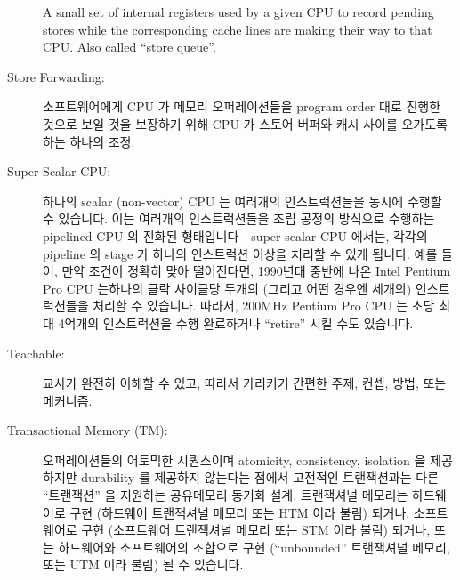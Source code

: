 \begin{description}
	A small set of internal registers used by a given CPU
	to record pending stores
	while the corresponding cache lines are making their
	way to that CPU.
	Also called ``store queue''.
	\fi
\item[Store Forwarding:]
	소프트웨어에게 CPU 가 메모리 오퍼레이션들을 program order 대로 진행한
	것으로 보일 것을 보장하기 위해 CPU 가 스토어 버퍼와 캐시 사이를
	오가도록 하는 하나의 조정.
	\iffalse

	An arrangement where a given CPU refers to its store buffer
	as well as its cache so as to ensure that the software sees
	the memory operations performed by this CPU as if they
	were carried out in program order.
	\fi
\item[Super-Scalar CPU:]
	하나의 scalar (non-vector) CPU 는 여러개의 인스트럭션들을 동시에 수행할
	수 있습니다.
	이는 여러개의 인스트럭션들을 조립 공정의 방식으로 수행하는 pipelined
	CPU 의 진화된 형태입니다---super-scalar CPU 에서는, 각각의 pipeline 의
	stage 가 하나의 인스트럭션 이상을 처리할 수 있게 됩니다.
	예를 들어, 만약 조건이 정확히 맞아 떨어진다면, 1990년대 중반에 나온
	Intel Pentium Pro CPU 는하나의 클락 사이클당 두개의 (그리고 어떤 경우엔
	세개의) 인스트럭션들을 처리할 수 있습니다.
	따라서, 200MHz Pentium Pro CPU 는 초당 최대 4억개의 인스트럭션을 수행
	완료하거나 ``retire'' 시킬 수도 있습니다.
	\iffalse

	A scalar (non-vector) CPU capable of executing multiple instructions
	concurrently.
	This is a step up from a pipelined CPU that executes multiple
	instructions in an assembly-line fashion---in a super-scalar
	CPU, each stage of the pipeline would be capable of handling
	more than one instruction.
	For example, if the conditions were exactly right,
	the Intel Pentium Pro CPU from the mid-1990s could
	execute two (and sometimes three) instructions per clock cycle.
	Thus, a 200\,MHz Pentium Pro CPU could ``retire'', or complete the
	execution of, up to 400 million instructions per second.
	\fi
\item[Teachable:]
	교사가 완전히 이해할 수 있고, 따라서 가리키기 간편한 주제, 컨셉, 방법,
	또는 메커니즘.
	\iffalse

	A topic, concept, method, or mechanism that the teacher understands
	completely and is therefore comfortable teaching.
	\fi
\item[Transactional Memory (TM):]
	오퍼레이션들의 어토믹한 시퀀스이며 atomicity, consistency, isolation 을
	제공하지만 durability 를 제공하지 않는다는 점에서 고전적인 트랜잭션과는
	다른 ``트랜잭션'' 을 지원하는 공유메모리 동기화 설계. 
	트랜잭셔널 메모리는 하드웨어로 구현 (하드웨어 트랜잭셔널 메모리 또는
	HTM 이라 불림) 되거나, 소프트웨어로 구현 (소프트웨어 트랜잭셔널 메모리
	또는 STM 이라 불림) 되거나, 또는 하드웨어와 소프트웨어의 조합으로 구현
	(``unbounded'' 트랜잭셔널 메모리, 또는 UTM 이라 불림) 될 수 있습니다.
	\iffalse


\end{description}
